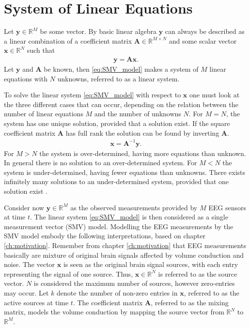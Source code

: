 \section{System of Linear Equations}\label{sec:SMV}
Let $\mathbf{y} \in \mathbb{R}^M$ be some vector. By basic linear algebra $\mathbf{y}$ can always be described as a linear combination of a coefficient matrix $\mathbf{A} \in \mathbb{R}^{M \times N}$ and some scalar vector $\mathbf{x} \in \mathbb{R}^N$ such that
\begin{align}\label{eq:SMV_model}
\mathbf{y} = \mathbf{Ax}.
\end{align}
Let $\mathbf{y}$ and $\mathbf{A}$ be known, then  
\ref{eq:SMV_model} makes a system of $M$ linear equations with $N$ unknowns, referred to as a linear system. 

To solve the linear system \ref{eq:SMV_model} with respect to $\textbf{x}$ one must look at the three different cases that can occur, depending on the relation between the number of linear equations $M$ and the number of unknowns $N$.
For $M = N$, the system has one unique solution, provided that a solution exist.  
If the square coefficient matrix $\mathbf{A}$ has full rank the solution can be found by inverting $\mathbf{A}$.
\begin{align*}
\mathbf{x} = \mathbf{A}^{-1} \mathbf{y}.
\end{align*}
For $M > N$ the system is over-determined, having more equations than unknown. In general there is no solution to an over-determined system.   
For $M < N$ the system is under-determined, having fewer equations than unknowns. There exists infinitely many solutions to an under-determined system, provided that one solution exist \cite[p. ix]{CS}.  

Consider now $\mathbf{y} \in \mathbb{R}^M$ as the observed measurements provided by $M$ EEG sensors at time $t$. 
The linear system \ref{eq:SMV_model} is then considered as a single measurement vector (SMV) model.  
Modelling the EEG measurements by the SMV model embody the following interpretations, based on chapter \ref{ch:motivation}.
Remember from chapter \ref{ch:motivation} that EEG measurements basically are mixture of original brain signals affected by volume conduction and noise.
The vector $\mathbf{x}$ is seen as the original brain signal sources, with each entry representing the signal of one source. 
Thus, $\mathbf{x} \in \mathbb{R}^N$ is referred to as the source vector. 
$N$ is considered the maximum number of sources, however zero-entries may occur. 
Let $k$ denote the number of non-zero entries in $\mathbf{x}$, referred to as the active sources at time $t$.   
The coefficient matrix $\mathbf{A}$, referred to as the mixing matrix, models the volume conduction by mapping the source vector from $\mathbb{R}^N$ to $\mathbb{R}^M$.

